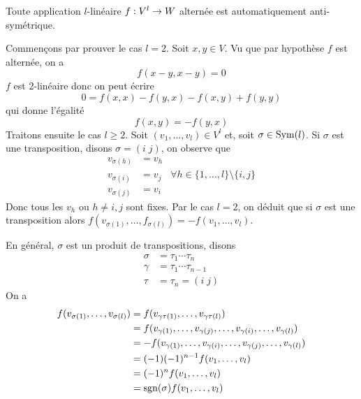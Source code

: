 \begin{proposition}
  Toute application $l$-linéaire $f: V^l \rightarrow W$ alternée est automatiquement anti-symétrique.
  \tcblower
  \begin{preuve}
    Commençons par prouver le cas $l=2$. Soit $x, y \in V$. Vu que par hypothèse $f$ est alternée, on a
    $$f(x-y, x-y) = 0$$
    $f$ est 2-linéaire donc on peut écrire
    $$0 = f(x, x) - f(y, x) - f(x, y) + f(y, y)$$
    qui donne l'égalité
    $$f(x, y) = -f(y, x)$$
    Traitons ensuite le cas $l \geq 2$. Soit  $(v_1, \dots, v_l) \in V^l$ et, soit $\sigma \in \operatorname{Sym}(l)$. Si $\sigma$ est une transposition, disons $\sigma = (i \; j)$, on observe que
    \begin{align*}
      v_{\sigma(h)} &= v_h \\
      v_{\sigma(i)} &= v_j  & \forall h \in \{ 1, \dots, l\} \setminus \{i, j \} \\
      v_{\sigma(j)} &= v_i
    \end{align*}
    Donc tous les $v_h$ ou $h \not = i, j$ sont fixes. Par le cas $l=2$, on déduit que si $\sigma$ est une transposition alors $f(v_{\sigma(1)}, \dots, f_{\sigma(l)}) = -f(v_1, \dots, v_l)$.
    \par En général, $\sigma$ est un produit de transpositions, disons
    \begin{align*}
      \sigma &= \tau_1 \cdots \tau_n \\
      \gamma &= \tau_1 \cdots \tau_{n-1} \\
      \tau &= \tau_n = (i \; j)
    \end{align*}
    On a
    \begin{align*}
      f(v_{\sigma(1)}, \dots, v_{\sigma(l)}) &= f(v_{\gamma\tau(1)}, \dots, v_{\gamma\tau(l)}) \\
                                             &= f(v_{\gamma(1)}, \dots, v_{\gamma(j)}, \dots, v_{\gamma(i)}, \dots, v_{\gamma(l)}) \\
                                             &= -f(v_{\gamma(1)}, \dots, v_{\gamma(i)}, \dots, v_{\gamma(j)}, \dots, v_{\gamma(l)}) \\
                                             &= (-1)(-1)^{n-1}f(v_1, \dots, v_l) \\
                                             &= (-1)^n f(v_1, \dots, v_l) \\
                                             &= \operatorname{sgn}(\sigma)f(v_1, \dots, v_l)
    \end{align*}
  \end{preuve}
\end{proposition}

